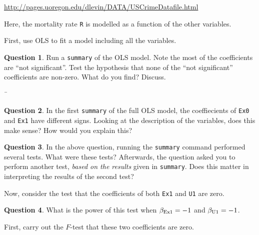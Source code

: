\documentclass{amsart}\usepackage[]{graphicx}\usepackage[]{color}
\theoremstyle{definition}
\newtheorem{question}{Question}
\begin{document}
\url{http://pages.uoregon.edu/dlevin/DATA/USCrimeDatafile.html}

Here, the mortality rate \verb|R| is modelled as a function of the other variables.


First, use OLS to fit a model including all the variables.

\begin{question}
Run a \verb|summary| of the OLS model.  Note the most of the coefficients are ``not significant''.
Test the hypothesis that none of the ``not significant'' coefficients are non-zero.  What do you find?  Discuss.
\end{question}¯

\begin{question}
In the first \verb|summary| of the full OLS model, the coeffiecients of \verb|Ex0| and \verb|Ex1| have different signs.
Looking at the description of the variables, does this make sense?  How would you explain this?
\end{question}
\begin{question}
  In the above question, running the \verb|summary| command performed several tests.  What were these tests?  Afterwards, the question asked you to perform another test, \emph{based on the results} given in \verb|summary|.  Does this matter in interpreting the results of the second test?
\end{question}

Now, consider the test that the
coefficients of both \verb|Ex1| and \verb|U1| are zero.

\begin{question}
What is the power of this test when $\beta_{{\rm Ex1}} = -1$
and $\beta_{{\rm U1}} = -1$.
\end{question}
First, carry out the $F$-test that these two coefficients are zero.
\end{document}
